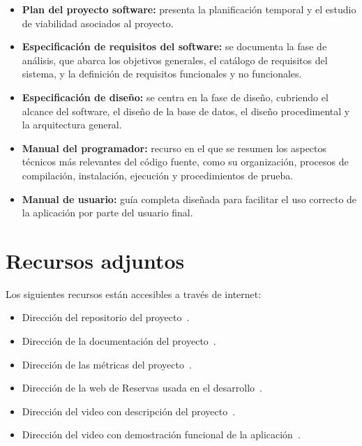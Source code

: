 \begin{itemize}
\tightlist
\item
  \textbf{Plan del proyecto software:} presenta la planificación temporal y el estudio de viabilidad asociados al proyecto.
\item
  \textbf{Especificación de requisitos del software:} se documenta la fase de análisis, que abarca los objetivos generales, el catálogo de requisitos del sistema, y la definición de requisitos funcionales y no funcionales.
\item
  \textbf{Especificación de diseño:} se centra en la fase de diseño, cubriendo el alcance del software, el diseño de la base de datos, el diseño procedimental y la arquitectura general.
\item
  \textbf{Manual del programador:} recurso en el que se resumen los aspectos técnicos más relevantes del código fuente, como su organización, procesos de compilación, instalación, ejecución y procedimientos de prueba.
\item
  \textbf{Manual de usuario:} guía completa diseñada para facilitar el uso correcto de la aplicación por parte del usuario final.
\end{itemize}

\section{Recursos adjuntos}\label{materiales-adjuntos}

Los siguientes recursos están accesibles a través de internet: 

\begin{itemize}
\tightlist
\item
	Dirección del repositorio del proyecto~\cite{reservapp:repo}.
\item
	Dirección de la documentación del proyecto~\cite{reservapp:documentacion}.
\item	
	Dirección de las métricas del proyecto~\cite{reservapp:sonarcloud}.
\item	
    Dirección de la web de Reservas usada en el desarrollo~\cite{reservapp:app}.
\item
	Dirección del video con descripción del proyecto~\cite{reservapp:descripcion}.
\item	
	Dirección del video con demostración funcional de la aplicación~\cite{reservapp:demostracion}.
\end{itemize}
